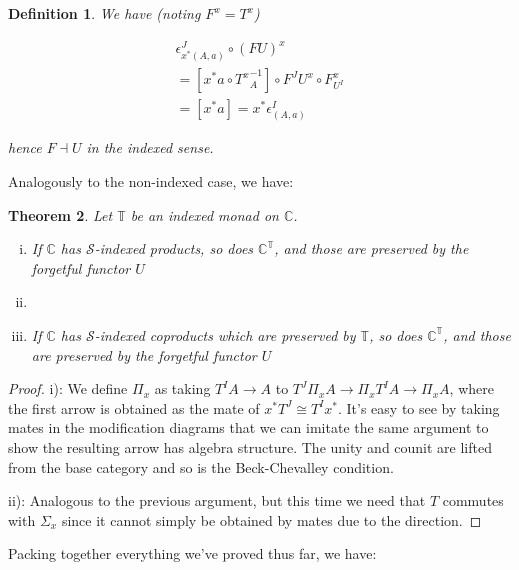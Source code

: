 \documentclass[10pt, oneside]{article}
\newtheorem{theorem}{Theorem}[section]
\newtheorem{definition}[theorem]{Definition}
\begin{document}
\begin{definition}
	We have (noting $F^x = T^x$)
	
	\begin{align*}
		\epsilon^J_{x^\ast (A, a)} \circ (FU)^x
		\\ = [x^\ast a \circ {T^x}^{-1}_A] \circ F^J U^x \circ F^x_{U^I}
		\\ = [x^\ast a] = x^\ast \epsilon^I_{(A, a)}
	\end{align*}
	
	\noindent hence $F \dashv U$ in the indexed sense.
\end{definition}

Analogously to the non-indexed case, we have:

\begin{theorem}
	Let $\mathbb{T}$ be an indexed monad on $\mathbb{C}$.
	
	\begin{enumerate}[i)]
		\item If $\mathbb{C}$ has $\mathcal{S}$-indexed products, so does $\mathbb{C}^\mathbb{T}$, and those are preserved by the forgetful functor $U$
		
		\item \item If $\mathbb{C}$ has $\mathcal{S}$-indexed coproducts which are preserved by $\mathbb{T}$, so does $\mathbb{C}^\mathbb{T}$, and those are preserved by the forgetful functor $U$
	\end{enumerate}
\end{theorem}
\begin{proof}
	i): We define $\Pi_x$ as taking $T^I A \to A$ to $T^J \Pi_x A \to \Pi_x T^I A \to \Pi_x A$, where the first arrow is obtained as the mate of $x^\ast T^J \cong T^I x^\ast$. It's easy to see by taking mates in the modification diagrams that we can imitate the same argument to show the resulting arrow has algebra structure. The unity and counit are lifted from the base category and so is the Beck-Chevalley condition.
	
	ii): Analogous to the previous argument, but this time we need that $T$ commutes with $\Sigma_x$ since it cannot simply be obtained by mates due to the direction.
\end{proof}

Packing together everything we've proved thus far, we have:
\end{document}
